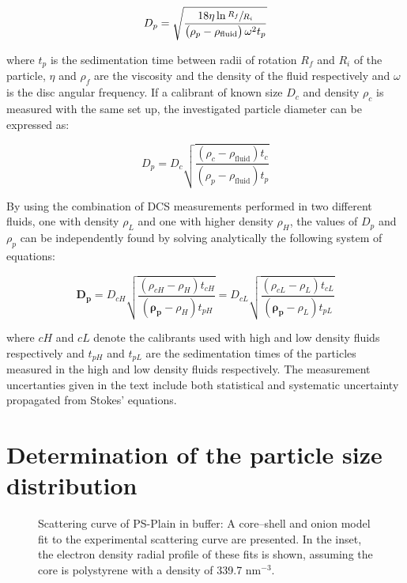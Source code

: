 \begin{equation}
D_p=\sqrt{\frac{18\eta\ln\sfrac{R_f}{R_i}}{\left( \rho_p - \rho_{\text{fluid}} \right)\omega^2 t_p}}
\label{eq:stokes}
\end{equation}

where $t_p$ is the sedimentation time between radii of rotation $R_f$ and $R_i$ of the particle, $\eta$ and $\rho_f$ are the viscosity and the density of the fluid respectively and $\omega$ is the disc angular frequency. If a calibrant of known size $D_c$ and density $\rho_c$ is measured with the same set up, the investigated particle diameter can be expressed as:

\begin{equation}
D_p=D_c\sqrt{\frac{\left( \rho_c - \rho_{\text{fluid}} \right) t_c}{\left( \rho_p - \rho_{\text{fluid}} \right) t_p}}
\label{eq:software}
\end{equation}

By using the combination of DCS measurements performed in two different fluids, one with density $\rho_L$ and one with higher density $\rho_H$, the values of $D_p$ and $\rho_p$ can be independently found by solving analytically the following system of equations:

\begin{equation}
\bm{D_p} = D_{cH}\sqrt{\frac{\left( \rho_{cH} - \rho_H \right) t_{cH}}{\left( \bm{\rho_p} - \rho_H \right) t_{pH}}} = D_{cL}\sqrt{\frac{\left( \rho_{cL} - \rho_L \right) t_{cL}}{\left( \bm{\rho_p} - \rho_L \right) t_{pL}}}
\label{eq:DCS_sys}
\end{equation}

where $cH$ and $cL$ denote the calibrants used with high and low density fluids respectively and $t_{pH}$ and $t_{pL}$ are the sedimentation times of the particles measured in the high and low density fluids respectively. The measurement uncertanties given in the text include both statistical and systematic uncertainty propagated from Stokes' equations.

\section{Determination of the particle size distribution}
\label{sec:size_validation}

\begin{figure}
	\begin{center}
		
	\end{center}
	\caption{Scattering curve of PS-Plain in buffer: A core–shell and onion model fit to the experimental scattering curve are presented. In the inset, the electron density radial profile
	\label{fig:PSPlainSingleContrastSAXS}
of these fits is shown, assuming the core is polystyrene with a density of 339.7 nm$^{-3}$.}
\end{figure}

